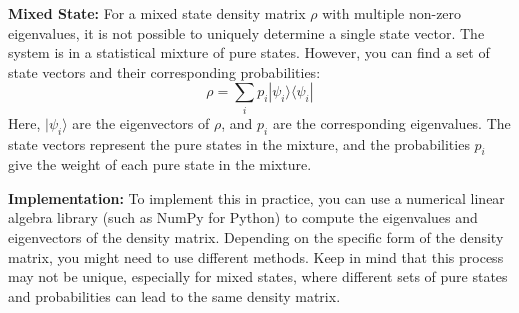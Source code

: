 \documentclass{article}
\begin{document}
\textbf{Mixed State:}
For a mixed state density matrix $\rho$ with multiple non-zero eigenvalues, it is not possible to uniquely determine a single state vector. The system is in a statistical mixture of pure states. However, you can find a set of state vectors and their corresponding probabilities:
\[ \rho = \sum_i p_i |\psi_i\rangle\langle\psi_i| \]
Here, $|\psi_i\rangle$ are the eigenvectors of $\rho$, and $p_i$ are the corresponding eigenvalues. The state vectors represent the pure states in the mixture, and the probabilities $p_i$ give the weight of each pure state in the mixture.

\textbf{Implementation:}
To implement this in practice, you can use a numerical linear algebra library (such as NumPy for Python) to compute the eigenvalues and eigenvectors of the density matrix. Depending on the specific form of the density matrix, you might need to use different methods.
Keep in mind that this process may not be unique, especially for mixed states, where different sets of pure states and probabilities can lead to the same density matrix.

\newpage


\end{document}
